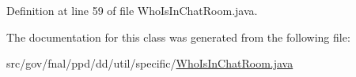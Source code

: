 Definition at line 59 of file Who\-Is\-In\-Chat\-Room.\-java.



The documentation for this class was generated from the following file\-:\begin{DoxyCompactItemize}
\item 
src/gov/fnal/ppd/dd/util/specific/\hyperlink{WhoIsInChatRoom_8java}{Who\-Is\-In\-Chat\-Room.\-java}\end{DoxyCompactItemize}
